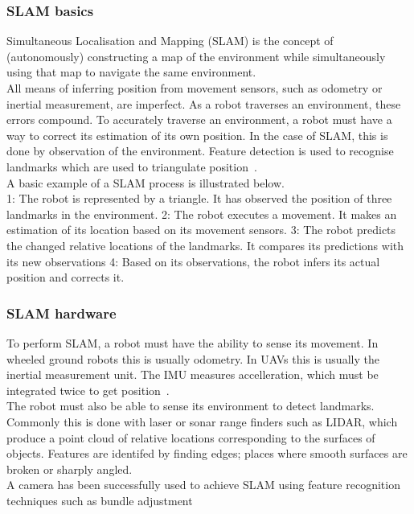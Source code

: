 \documentclass[a4paper, 12pt, titlepage]{article}
\begin{document}
	\subsubsection{SLAM basics}
	Simultaneous Localisation and Mapping (SLAM) is the concept of (autonomously) constructing a map of the environment while simultaneously using that map to navigate the same environment. 
	\\All means of inferring position from movement sensors, such as odometry or inertial measurement, are imperfect. As a robot traverses an environment, these errors compound. To accurately traverse an environment, a robot must have a way to correct its estimation of its own position. In the case of SLAM, this is done by observation of the environment. Feature detection is used to recognise landmarks which are used to triangulate position~\cite{Blas}.
	\\A basic example of a SLAM process is illustrated below. 
	\\1: The robot is represented by a triangle. It has observed the position of three landmarks in the environment.
	2: The robot executes a movement. It makes an estimation of its location based on its movement sensors.
	3: The robot predicts the changed relative locations of the landmarks. It compares its predictions with its new observations
	4: Based on its observations, the robot infers its actual position and corrects it.
	
		\subsubsection{SLAM hardware}
		To perform SLAM, a robot must have the ability to sense its movement. In wheeled ground robots this is usually odometry. In UAVs this is usually the inertial measurement unit. The IMU measures accelleration, which must be integrated twice to get position~\cite{kim2007real}.
		\\The robot must also be able to sense its environment to detect landmarks. Commonly this is done with laser or sonar range finders such as LIDAR, which produce a point cloud of relative locations corresponding to the surfaces of objects. Features are identifed by finding edges; places where smooth surfaces are broken or sharply angled.
		\\A camera has been successfully used to achieve SLAM using feature recognition techniques such as bundle adjustment%
		
\end{document}
